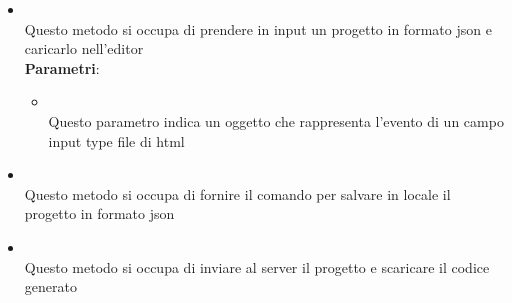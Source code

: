 \begin{itemize}
\begin{itemize}
\item {}
\\ Questo metodo si occupa di prendere in input un progetto in formato json e caricarlo nell'editor
\\ \textbf{Parametri}:
\begin{itemize}
\item {}
\\ Questo parametro indica un oggetto che rappresenta l'evento di un campo input type file di html
\end{itemize}
\item {}
\\ Questo metodo si occupa di fornire il comando per salvare in locale il progetto in formato json
\item {}
\\ Questo metodo si occupa di inviare al server il progetto e scaricare il codice generato
\end{itemize}
\end{itemize}


